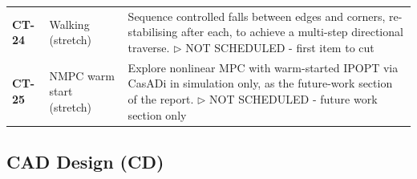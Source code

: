 {\begin{longtable}{@{}L{1.1cm} L{3.0cm} L{11.0cm}@{}}
\textbf{CT-24} & Walking (stretch) & Sequence controlled falls between edges and corners, re-stabilising after each, to achieve a multi-step directional traverse. \newline\textcolor{p0col}{\footnotesize$\triangleright$ NOT SCHEDULED - first item to cut} \\[2pt]
\textbf{CT-25} & NMPC warm start (stretch) & Explore nonlinear MPC with warm-started IPOPT via CasADi in simulation only, as the future-work section of the report. \newline\textcolor{p0col}{\footnotesize$\triangleright$ NOT SCHEDULED - future work section only} \\[2pt]
\end{longtable}
}

\subsection{CAD Design (CD)}
